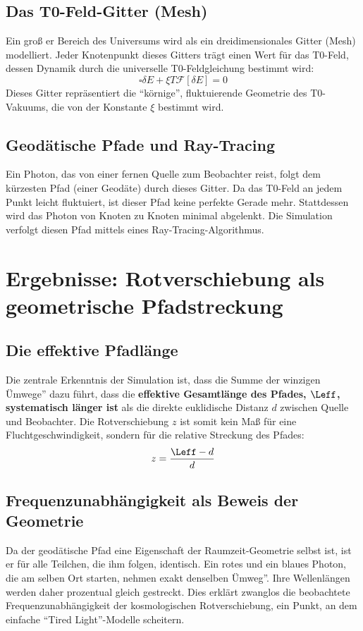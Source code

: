 	\subsection{Das T0-Feld-Gitter (Mesh)}
	Ein groß er Bereich des Universums wird als ein dreidimensionales Gitter (Mesh) modelliert. Jeder Knotenpunkt dieses Gitters trägt einen Wert für das T0-Feld, dessen Dynamik durch die universelle T0-Feldgleichung bestimmt wird:
	\begin{equation}
		\square\delta E + \xi T \mathcal{F}[\delta E] = 0
	\end{equation}
	Dieses Gitter repräsentiert die ``körnige'', fluktuierende Geometrie des T0-Vakuums, die von der Konstante $\xi$ bestimmt wird.
	\subsection{Geodätische Pfade und Ray-Tracing}
	Ein Photon, das von einer fernen Quelle zum Beobachter reist, folgt dem kürzesten Pfad (einer Geodäte) durch dieses Gitter. Da das T0-Feld an jedem Punkt leicht fluktuiert, ist dieser Pfad keine perfekte Gerade mehr. Stattdessen wird das Photon von Knoten zu Knoten minimal abgelenkt. Die Simulation verfolgt diesen Pfad mittels eines Ray-Tracing-Algorithmus.
	\section{Ergebnisse: Rotverschiebung als geometrische Pfadstreckung}
	\subsection{Die effektive Pfadlänge}
	Die zentrale Erkenntnis der Simulation ist, dass die Summe der winzigen Ümwege'' dazu führt, dass die \textbf{effektive Gesamtlänge des Pfades, $\Leff$, systematisch länger ist} als die direkte euklidische Distanz $d$ zwischen Quelle und Beobachter.
	Die Rotverschiebung $z$ ist somit kein Maß{} für eine Fluchtgeschwindigkeit, sondern für die relative Streckung des Pfades:
	\begin{equation}
		z = \frac{\Leff - d}{d}
	\end{equation}
	\subsection{Frequenzunabhängigkeit als Beweis der Geometrie}
	Da der geodätische Pfad eine Eigenschaft der Raumzeit-Geometrie selbst ist, ist er für alle Teilchen, die ihm folgen, identisch. Ein rotes und ein blaues Photon, die am selben Ort starten, nehmen exakt denselben Ümweg''. Ihre Wellenlängen werden daher prozentual gleich gestreckt. Dies erklärt zwanglos die beobachtete Frequenzunabhängigkeit der kosmologischen Rotverschiebung, ein Punkt, an dem einfache ``Tired Light''-Modelle scheitern.
